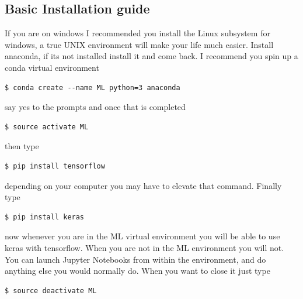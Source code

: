 \documentclass[a4paper]{article}
\begin{document}
\subsection{Basic Installation guide}
If you are on windows I recommended you install the Linux subsystem for windows, a true UNIX environment will make your life much easier.  Install anaconda, if its not installed install it and come back. I recommend you spin up a conda virtual environment
\begin{verbatim}
$ conda create --name ML python=3 anaconda
\end{verbatim}
say yes to the prompts and once that is completed
\begin{verbatim}
$ source activate ML
\end{verbatim}
then type
\begin{verbatim}
$ pip install tensorflow
\end{verbatim}
depending on your computer you may have to elevate that command. Finally type
\begin{verbatim}
$ pip install keras 
\end{verbatim}
now whenever you are in the ML virtual environment you will be able to use keras with tensorflow. When you are not in the ML environment you will not. You can launch Jupyter Notebooks from within the environment, and do anything else you would normally do. When you want to close it just type 
\begin{verbatim}
$ source deactivate ML
\end{verbatim}
\end{document}
